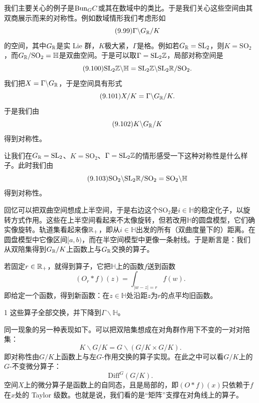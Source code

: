 我们主要关心的例子是$\mathrm{Bun}_G C$或其在数域中的类比。于是我们关心这些空间由其双商展示而来的对称性。例如数域情形我们考虑形如
\begin{equation}\tag{9.99}
\Gamma\backslash G_{\mathbb{R}}/K
\end{equation}
的空间，其中$G_{\mathbb{R}}$是实 Lie 群，$K$极大紧，$\Gamma$是格。例如若$G_{\mathbb{R}}=\mathrm{SL}_2$，则$K=\mathrm{SO}_2$，而$G_{\mathbb{R}}/\mathrm{SO}_2=\mathbb H$是双曲空间。于是可以取$\Gamma=\mathrm{SL}_2\mathbb{Z}$，局部对称空间是
\begin{equation}\tag{9.100}
\mathrm{SL}_2\mathbb{Z}\backslash\mathbb H=\mathrm{SL}_2\mathbb{Z}\backslash\mathrm{SL}_2\mathbb{R}/\mathrm{SO}_2.
\end{equation}
我们把$X=\Gamma\backslash G_{\mathbb{R}}$，于是空间具有形式
\begin{equation}\tag{9.101}
X/K=\Gamma\backslash G_{\mathbb{R}}/K.
\end{equation}
于是我们由
\begin{equation}\tag{9.102}
K\backslash G_{\mathbb{R}}/K
\end{equation}
得到对称性。

让我们在$G_{\mathbb{R}}=\mathrm{SL}_2$、$K=\mathrm{SO}_2$、$\Gamma=\mathrm{SL}_2\mathbb{Z}$的情形感受一下这种对称性是什么样子。此时我们由
\begin{equation}\tag{9.103}
\mathrm{SO}_2\backslash\mathrm{SL}_2\mathbb{R}/\mathrm{SO}_2=\mathrm{SO}_2\backslash\mathbb H
\end{equation}
得到对称性。

回忆可以把双曲空间想成上半空间，于是右边这个$\mathrm{SO}_2$是$i\in\mathbb H$的稳定化子，以旋转方式作用。这些在上半空间看起来不太像旋转，但若改用$\mathbb H$的圆盘模型，它们确实像旋转。轨道集看起来像$\mathbb{R}_{+}$，即从$i\in\mathbb H$出发的所有（双曲度量下的）距离。在圆盘模型中它像区间$[a,b)$，而在半空间模型中更像一条射线。于是断言是：我们从双陪集得到$G_{\mathbb{R}}/K$上函数上与$G_{\mathbb{R}}$交换的算子。

若固定$r\in\mathbb{R}_{+}$，就得到算子，它把$\mathbb H$上的函数$f$送到函数
\begin{equation}\tag{9.104}
(O_r*f)(z)=\int_{|w-z|=r}f(w).
\end{equation}
即给定一个函数，得到新函数：在$z\in\mathbb H$处沿距$z$为$r$的点平均旧函数。

\begin{srcclaim}{1}
这些算子全部交换，并下降到$\Gamma\backslash\mathbb H$。
\end{srcclaim}

同一现象的另一种表现如下。可以把双陪集想成在对角群作用下不变的一对对陪集：
\begin{equation}\tag{9.105}
K\backslash G/K=G\backslash(G/K\times G/K).
\end{equation}
即对称性由$G/K$上函数上与左$G$-作用交换的算子实现。在此之中可以看$G/K$上的$G$-不变微分算子：
\begin{equation}\tag{9.106}
\mathrm{Diff}^{G}(G/K).
\end{equation}
空间$X$上的微分算子是函数上的自同态，且是局部的，即$(O*f)(x)$只依赖于$f$在$x$处的 Taylor 级数。也就是说，我们看的是“矩阵”支撑在对角线上的算子。

